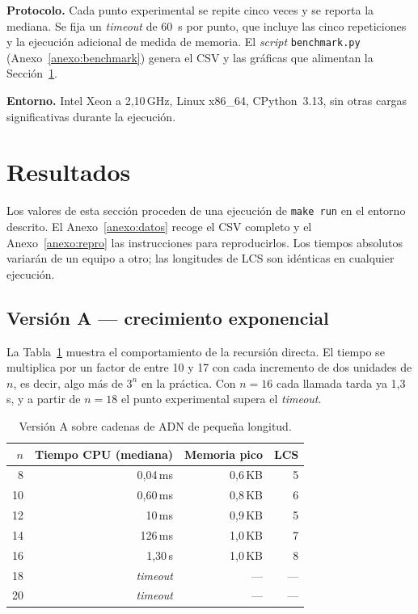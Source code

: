 \documentclass[11pt,a4paper]{article}
\begin{document}
\textbf{Protocolo.} Cada punto experimental se repite cinco veces y se
reporta la mediana. Se fija un \emph{timeout} de 60~s por punto, que
incluye las cinco repeticiones y la ejecución adicional de medida de
memoria. El \emph{script}
\texttt{benchmark.py} (Anexo~\ref{anexo:benchmark}) genera el CSV y las
gráficas que alimentan la Sección~\ref{sec:resultados}.

\textbf{Entorno.} Intel Xeon a 2,10\,GHz, Linux x86\_64, CPython~3.13,
sin otras cargas significativas durante la ejecución.

\section{Resultados}\label{sec:resultados}

Los valores de esta sección proceden de una ejecución de
\texttt{make run} en el entorno descrito. El Anexo~\ref{anexo:datos}
recoge el CSV completo y el Anexo~\ref{anexo:repro} las instrucciones
para reproducirlos. Los tiempos absolutos variarán de un equipo a otro;
las longitudes de LCS son idénticas en cualquier ejecución.

\subsection{Versión A — crecimiento exponencial}

La Tabla~\ref{tab:A} muestra el comportamiento de la recursión directa.
El tiempo se multiplica por un factor de entre 10 y 17 con cada
incremento de dos unidades de $n$, es decir, algo más de $3^{n}$ en la
práctica. Con $n=16$ cada llamada tarda ya 1,3\,s, y a partir de $n=18$
el punto experimental supera el \emph{timeout}.

\begin{table}[h]
\centering
\begin{tabular}{@{}rrrr@{}}
\toprule
$n$ & Tiempo CPU (mediana) & Memoria pico & LCS \\
\midrule
8    & 0{,}04\,ms        & 0{,}6\,KB & 5 \\
10   & 0{,}60\,ms        & 0{,}8\,KB & 6 \\
12   & 10\,ms            & 0{,}9\,KB & 5 \\
14   & 126\,ms           & 1{,}0\,KB & 7 \\
16   & 1{,}30\,s         & 1{,}0\,KB & 8 \\
18   & \textit{timeout}  & ---       & --- \\
20   & \textit{timeout}  & ---       & --- \\
\bottomrule
\end{tabular}
\caption{Versión A sobre cadenas de ADN de pequeña longitud.}\label{tab:A}
\end{table}
\end{document}
